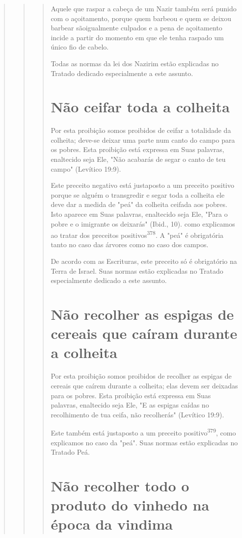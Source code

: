 \begin{quote}
\begin{quote}
\begin{quote}
Aquele que raspar a cabeça de um Nazir também será punido com o
açoitamento, porque quem barbeou e quem se deixou barbear sãoigualmen­te
culpados e a pena de açoitamento incide a partir do momento em que ele
tenha raspado um único fio de cabelo.

Todas as normas da lei dos Nazirim estão explicadas no Tratado de­dicado
especialmente a este assunto.

\section{Não ceifar toda a colheita}

Por esta proibição somos proibidos de ceifar a totalidade da colhei­ta;
deve-se deixar uma parte num canto do campo para os pobres. Esta
proibi­ção está expressa em Suas palavras, enaltecido seja Ele, "Não
acabarás de segar o canto de teu campo" (Levítico 19:9).

Este preceito negativo está justaposto a um preceito positivo por­que se
alguém o transgredir e segar toda a colheita ele deve dar a medida de
"peá" da colheita ceifada aos pobres. Isto aparece em Suas palavras,
enaltecido seja Ele, "Para o pobre e o imigrante os deixarás" (Ibid.,
10). como explicamos ao tratar dos preceitos
positivos\textsuperscript{378}. A "peá" é obrigatória tanto no caso das
árvores como no caso dos campos.

De acordo com as Escrituras, este preceito só é obrigatório na Terra de
Israel. Suas normas estão explicadas no Tratado especialmente dedicado a
este assunto.

\section{Não recolher as espigas de cereais que caíram durante a colheita}

Por esta proibição somos proibidos de recolher as espigas de cereais que
caírem durante a colheita; elas devem ser deixadas para os pobres. Esta
proi­bição está expressa em Suas palavras, enaltecido seja Ele, "E as
espigas caídas no recolhimento de tua ceifa, não recolherás" (Levítico
19:9).

Este também está justaposto a um preceito positivo\textsuperscript{379},
como expli­camos no caso da "peá". Suas normas estão explicadas no
Tratado Peá.

\section{Não recolher todo o produto do vinhedo na época da vindima}


\end{quote}
\end{quote}
\end{quote}
